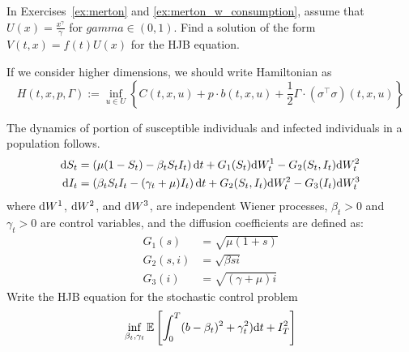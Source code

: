 \documentclass[11pt]{book}
\newcommand{\dd}{\text{\normalfont d}}
\newcommand{\dt}{\text{\normalfont d}t}
\newcommand{\dW}{\text{\normalfont d}W}
\begin{document}
\begin{ex}\label{ex:merton_w_consumption_solution}
    In Exercises~\ref{ex:merton} and \ref{ex:merton_w_consumption}, assume that $U(x)=\frac{x^\gamma}{\gamma}$ for $gamma\in(0,1)$. Find a solution of the form $V(t,x)=f(t)U(x)$ for the HJB equation.
\end{ex}

If we consider higher dimensions, we should write Hamiltonian as  
\begin{equation}
H(t,x,p,\Gamma):=\inf_{u\in U}\left\{ C(t,x,u)  + p\cdot b(t,x,u)+\frac12 \Gamma\cdot(\sigma^{\top}\sigma)(t,x,u)\right\}
\end{equation}
\begin{ex}
The dynamics of portion of susceptible individuals and infected individuals in a population follows.
\begin{align*}
\dd{S}_t &= \left( \mu(1 - S_t) - \beta_t S_t I_t \right) \dt + G_1(S_t) \dW_t^{1}- G_2(S_t,I_t) \dW_t^{2} \\
\dd{I}_t &= \left( \beta_t S_t I_t - (\gamma_t + \mu)I_t \right) \dt + G_2(S_t,I_t)  \dW_t^{2} - G_3(I_t)  \dW_t^{3}
\end{align*}
where $\dW^1$, $\dW^2$, and $\dW^3$,  are independent Wiener processes, $\beta_t>0$ and $\gamma_t>0$ are control variables, and the diffusion coefficients are defined as:
\begin{align*}
G_1(s) &= \sqrt{\mu(1 + s)} \\
G_2(s,i) &= \sqrt{\beta s i} \\
G_3(i) &= \sqrt{(\gamma + \mu)i}
\end{align*}
Write the HJB equation for the stochastic control problem
\[
\inf_{\beta_t,\gamma_t}\mathbb{E}\left[\int_0^T (b-\beta_t)^2+\gamma_t^2 )\dt + I_T^2\right]
\]
\end{ex}
\end{document}
